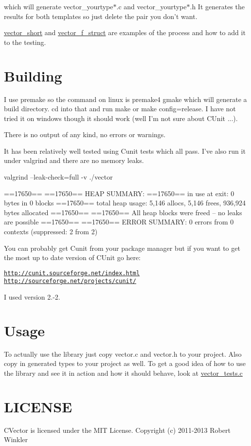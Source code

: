 which will generate vector\-\_\-yourtype$\ast$.c and vector\-\_\-yourtype$\ast$.h It generates the results for both templates so just delete the pair you don't want.

\hyperlink{structvector__short}{vector\-\_\-short} and \hyperlink{structvector__f__struct}{vector\-\_\-f\-\_\-struct} are examples of the process and how to add it to the testing.\hypertarget{index_Building}{}\section{Building}\label{index_Building}
I use premake so the command on linux is premake4 gmake which will generate a build directory. cd into that and run make or make config=release. I have not tried it on windows though it should work (well I'm not sure about C\-Unit ...).

There is no output of any kind, no errors or warnings.

It has been relatively well tested using Cunit tests which all pass. I've also run it under valgrind and there are no memory leaks.

valgrind --leak-\/check=full -\/v ./vector


\begin{DoxyPre}
==17650== 
==17650== HEAP SUMMARY:
==17650==     in use at exit: 0 bytes in 0 blocks
==17650==   total heap usage: 5,146 allocs, 5,146 frees, 936,924 bytes allocated
==17650== 
==17650== All heap blocks were freed -- no leaks are possible
==17650== 
==17650== ERROR SUMMARY: 0 errors from 0 contexts (suppressed: 2 from 2)
\end{DoxyPre}


You can probably get Cunit from your package manager but if you want to get the most up to date version of C\-Unit go here\-:

\href{http://cunit.sourceforge.net/index.html}{\tt http\-://cunit.\-sourceforge.\-net/index.\-html} \href{http://sourceforge.net/projects/cunit/}{\tt http\-://sourceforge.\-net/projects/cunit/}

I used version 2.-\/2.\hypertarget{index_Usage}{}\section{Usage}\label{index_Usage}
To actually use the library just copy vector.\-c and vector.\-h to your project. Also copy in generated types to your project as well. To get a good idea of how to use the library and see it in action and how it should behave, look at \hyperlink{vector__tests_8c}{vector\-\_\-tests.\-c}\hypertarget{index_LICENSE}{}\section{L\-I\-C\-E\-N\-S\-E}\label{index_LICENSE}
C\-Vector is licensed under the M\-I\-T License. Copyright (c) 2011-\/2013 Robert Winkler

